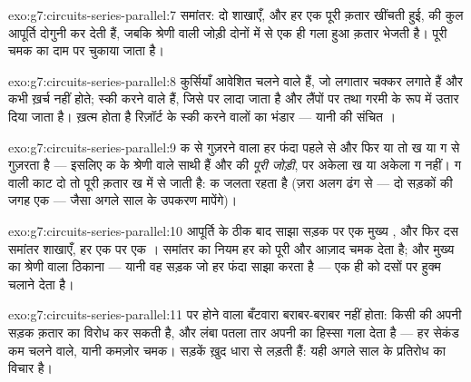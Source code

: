 \begin{solution}{exo:g7:circuits-series-parallel:7}
समांतर: दो शाखाएँ, और हर एक पूरी क़तार खींचती हुई,  की कुल आपूर्ति
दोगुनी कर देती हैं, जबकि श्रेणी वाली जोड़ी दोनों में से एक ही गला हुआ
क़तार भेजती है। पूरी चमक का दाम  पर चुकाया जाता है।
\end{solution}

\begin{solution}{exo:g7:circuits-series-parallel:8}
कुर्सियाँ आवेशित चलने वाले हैं, जो लगातार चक्कर लगाते हैं और कभी ख़र्च
नहीं होते; स्की करने वाले  हैं, जिसे  पर लादा जाता है और
लैंपों पर  तथा गरमी के रूप में उतार दिया जाता है। ख़त्म होता है
रिज़ॉर्ट के स्की करने वालों का भंडार --- यानी  की संचित ।
\end{solution}

\begin{solution}{exo:g7:circuits-series-parallel:9}
क से गुज़रने वाला हर फंदा पहले  से और फिर या तो ख या ग से गुज़रता
है --- इसलिए क के श्रेणी वाले साथी हैं  और  की \emph{पूरी
जोड़ी}, पर अकेला ख या अकेला ग नहीं। ग वाली  काट दो तो पूरी क़तार ख
में से जाती है: क जलता रहता है (ज़रा अलग ढंग से --- दो सड़कों की जगह
एक --- जैसा अगले साल के उपकरण मापेंगे)।
\end{solution}

\begin{solution}{exo:g7:circuits-series-parallel:10}
आपूर्ति के ठीक बाद साझा सड़क पर एक मुख्य , और फिर दस समांतर
शाखाएँ, हर एक पर एक । समांतर का नियम हर  को पूरी और आज़ाद चमक
देता है; और मुख्य  का श्रेणी वाला ठिकाना --- यानी वह सड़क जो हर
फंदा साझा करता है --- एक ही  को दसों पर हुक्म चलाने देता है।
\end{solution}

\begin{solution}{exo:g7:circuits-series-parallel:11}
 पर होने वाला बँटवारा बराबर-बराबर नहीं होता: किसी  की अपनी
सड़क क़तार का विरोध कर सकती है, और लंबा पतला तार अपनी  का हिस्सा
गला देता है --- हर सेकंड कम चलने वाले, यानी कमज़ोर चमक। सड़कें ख़ुद
धारा से लड़ती हैं: यही अगले साल के प्रतिरोध का विचार है।
\end{solution}

